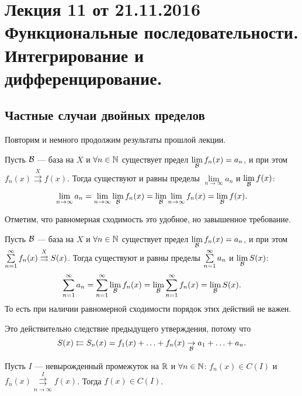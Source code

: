 \newcommand{\tto}{\rightrightarrows}
\newcommand{\dx}{\mathrm{d}x}
\renewcommand{\d}{\mathrm{d}}

\section{Лекция 11 от 21.11.2016 \\ Функциональные последовательности. Интегрирование и дифференцирование.}

\subsection{Частные случаи двойных пределов}

Повторим и немного продолжим результаты прошлой лекции.

\begin{Statement}
	Пусть $\mathcal{B}$ --- база на $X$ и $\forall n \in \mathbb{N}$ существует предел $\lim\limits_{\mathcal{B}} f_n(x) = a_n$, и при этом $f_n(x) \overset{X}{\tto} f(x)$. Тогда существуют и равны пределы $\lim\limits_{n \to \infty} a_n$ и $\lim\limits_{\mathcal{B}}f(x)$:
	$$
	\lim\limits_{n \to \infty} a_n = \lim\limits_{n \to \infty}\lim\limits_{\mathcal{B}}f_n(x) = \lim\limits_{\mathcal{B}}\lim\limits_{n \to \infty} f_n(x) = \lim\limits_{\mathcal{B}}f(x).
	$$
\end{Statement}

Отметим, что равномерная сходимость это удобное, но завышенное требование.

\begin{Consequence}
	Пусть $\mathcal{B}$ --- база на $X$ и $\forall n \in \mathbb{N}$ существует предел $\lim\limits_{\mathcal{B}}f_n(x) = a_n$, и при этом $\sseries f_n(x) \overset{X}{\tto} S(x)$. Тогда существуют и равны пределы $\sum\limits_{n=1}^{\infty} a_n$ и $\lim\limits_{\mathcal{B}} S(x)$:
	$$
	\sum\limits_{n=1}^{\infty} a_n =  \sum\limits_{n=1}^{\infty} \lim\limits_{\mathcal{B}}f_n(x) = \lim\limits_{\mathcal{B}}\sum\limits_{n=1}^{\infty} f_n(x) =	\lim\limits_{\mathcal{B}} S(x).
	$$
	То есть при наличии равномерной сходимости порядок этих действий не важен.
\end{Consequence}

Это действительно следствие предыдущего утверждения, потому что
$$
S(x) \leftleftarrows S_n(x) = f_1(x) + \ldots + f_n(x) \underset{\mathcal{B}}{\rightarrow} a_1 + \ldots + a_n.
$$

\begin{Consequence}
	Пусть $I$ --- невырожденный промежуток на $\mathbb{R}$ и $\forall n \in \mathbb{N}$: $f_n(x) \in C(I)$ и $f_n(x) \overset{I}{\underset{n \to \infty}{\tto}} f(x)$. Тогда $f(x) \in C(I)$. 
\end{Consequence}

